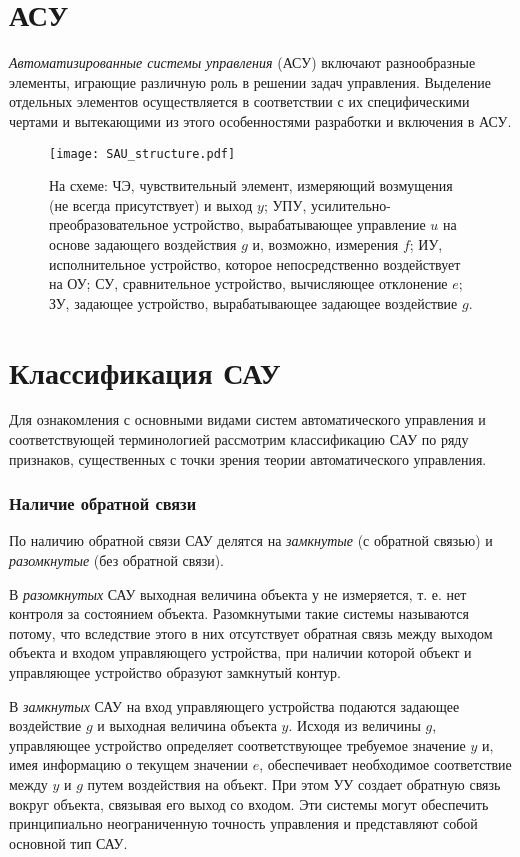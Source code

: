 \documentclass[../../TAU.tex]{subfiles}
\begin{document}
\section{АСУ}

    {\it Автоматизированные системы управления} (АСУ) включают разнообразные элементы, играющие различную роль в решении задач управления. Выделение отдельных элементов осуществляется в соответствии с их специфическими чертами и вытекающими из этого особенностями разработки и включения в АСУ. 

    \begin{figure}[h]
    \centering
    \texttt{[image: SAU\_structure.pdf]}
    \caption{На схеме: 
    ЧЭ, чувствительный элемент, измеряющий возмущения (не всегда присутствует)
     и выход $y$; УПУ, усилительно-преобразовательное устройство, вырабатывающее управление $u$ на основе задающего воздействия $g$ и, возможно, измерения $f$; ИУ, исполнительное устройство, которое непосредственно воздействует на ОУ; СУ, сравнительное устройство, вычисляющее отклонение $e$; ЗУ, задающее устройство, вырабатывающее задающее воздействие $g$.}
    \centering
    \end{figure}


\section{Классификация САУ}
    Для ознакомления с основными видами систем автоматического управления и соответствующей терминологией рассмотрим классификацию САУ по ряду признаков, существенных с точки зрения теории автоматического управления. 

\subsubsection{Наличие обратной связи \cite[стр. 14]{kim:uch}}
    По наличию обратной связи САУ делятся на {\it замкнутые} (с обратной связью) и {\it разомкнутые} (без обратной связи).\par
    В {\it разомкнутых} САУ выходная величина объекта у не измеряется, т. е. нет контроля за состоянием объекта. Разомкнутыми такие системы называются потому, что вследствие этого в них отсутствует обратная связь между выходом объекта и входом управляющего устройства, при наличии которой объект и управляющее устройство образуют замкнутый контур. \par
    В {\it замкнутых} САУ на вход управляющего устройства подаются задающее воздействие $g$ и выходная величина объекта $y$. Исходя из величины $g$, управляющее устройство определяет соответствующее требуемое значение $y$ и, имея информацию о текущем значении $e$, обеспечивает необходимое соответствие между $y$ и $g$ путем воздействия на объект. При этом УУ создает обратную связь вокруг объекта, связывая его выход со входом. Эти системы могут обеспечить принципиально неограниченную точность управления и представляют собой основной тип САУ. 
\end{document}
